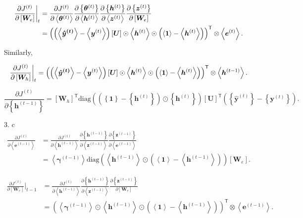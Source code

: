 \documentclass[twoside]{article}
\begin{document}
	\begin{align*}
		\frac{\partial J^{(t)}}{\partial\left[\bm{W}_e\right]}\bigg\rvert_t &= \frac{\partial J^{(t)}}{\partial\left<\bm{\theta}^{(t)}\right>}\frac{\partial\left\{\bm{\theta}^{(t)}\right\}}{\partial\left<\bm{h}^{(t)}\right>}\frac{\partial\left\{\bm{h}^{(t)}\right\}}{\partial\left<\bm{z}^{(t)}\right>}\frac{\partial\left\{\bm{z}^{(t)}\right\}}{\partial\left[\bm{W}_e\right]}\\
		&= \left(\left(\left<\bm{\hat{y}^{(t)}\right>}-\left<\bm{y}^{(t)}\right>\right)\left[\bm{U}\right]\odot\left<\bm{h}^{(t)}\right>\odot\left(\left<\bm{1}\right>-\left<\bm{h}^{(t)}\right>\right)\right)^\mathsf{T}\otimes\left<\bm{e}^{(t)}\right>.
	\end{align*}
	
	Similarly,
	
	\begin{equation*}
		\frac{\partial J^{(t)}}{\partial\left[\bm{W}_h\right]}\bigg\rvert_t = \left(\left(\left<\bm{\hat{y}^{(t)}\right>}-\left<\bm{y}^{(t)}\right>\right)\left[\bm{U}\right]\odot\left<\bm{h}^{(t)}\right>\odot\left(\left<\bm{1}\right>-\left<\bm{h}^{(t)}\right>\right)\right)^\mathsf{T}\otimes\left<\bm{h}^{(t-1)}\right>.
	\end{equation*}
	
	\begin{equation*}
	\frac{\partial J^{(t)}}{\partial\left\{\bm{h}^{(t-1)}\right\}} = \left[\bm{W}_h\right]^\mathsf{T}\mathrm{diag}\left(\left(\left\{\bm{1}\right\}-\left\{\bm{h}^{(t)}\right\}\right)\odot\left\{\bm{h}^{(t)}\right\}\right)\left[\bm{U}\right]^\mathsf{T}\left(\left\{\bm{\hat{y}}^{(t)}\right\}-\left\{\bm{y}^{(t)}\right\}\right).
	\end{equation*}

3. c
\begin{align*}
	\frac{\partial J^{(t)}}{\partial\left<\bm{e}^{(t-1)}\right>} &= \frac{\partial J^{(t)}}{\partial\left<\bm{h}^{(t-1)}\right>}\frac{\partial\left\{\bm{h}^{(t-1)}\right\}}{\partial\left<\bm{z}^{(t-1)}\right>}\frac{\partial\left\{\bm{z}^{(t-1)}\right\}}{\partial\left<\bm{e}^{(t-1)}\right>}\\
	&= \left<\bm{\gamma}^{(t-1)}\right>  \mathrm{diag}\left(\left<\bm{h}^{(t-1)}\right>\odot\left(\left<\bm{1}\right>-\left<\bm{h}^{(t-1)}\right>\right)\right) \left[\bm{W}_e\right].
\end{align*}

\begin{align*}
	\frac{\partial J^{(t)}}{\partial\left[\bm{W}_e\right]}\bigg\rvert_{t-1} &= \frac{\partial J^{(t)}}{\partial\left<\bm{h}^{(t-1)}\right>}\frac{\partial\left\{\bm{h}^{(t-1)}\right\}}{\partial\left<\bm{z}^{(t-1)}\right>}\frac{\partial\left\{\bm{z}^{(t-1)}\right\}}{\partial\left[\bm{W}_e\right]}\\
	&= \left(\left<\bm{\gamma}^{(t-1)}\right>\odot\left<\bm{h}^{(t-1)}\right>\odot\left(\left<\bm{1}\right>-\left<\bm{h}^{(t-1)}\right>\right)\right)^\mathsf{T}\otimes\left<\bm{e}^{(t-1)}\right>.
\end{align*}
\end{document}

